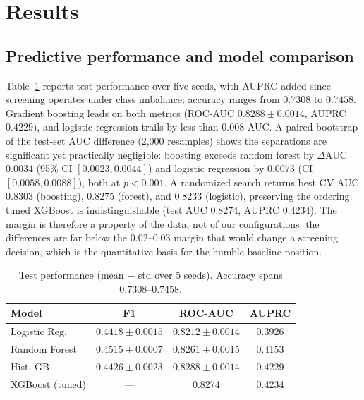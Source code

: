 \documentclass[conference]{IEEEtran}
\begin{document}
\section{Results}

\subsection{Predictive performance and model comparison}
Table~\ref{tab:perf} reports test performance over five seeds, with AUPRC added since screening operates under class imbalance; accuracy ranges from $0.7308$ to $0.7458$. Gradient boosting leads on both metrics (ROC-AUC $0.8288 \pm 0.0014$, AUPRC $0.4229$), and logistic regression trails by less than $0.008$ AUC. A paired bootstrap of the test-set AUC difference (2{,}000 resamples) shows the separations are significant yet practically negligible: boosting exceeds random forest by $\Delta$AUC $0.0034$ (95\% CI $[0.0023, 0.0044]$) and logistic regression by $0.0073$ (CI $[0.0058, 0.0088]$), both at $p<0.001$. A randomized search returns best CV AUC $0.8303$ (boosting), $0.8275$ (forest), and $0.8233$ (logistic), preserving the ordering; tuned XGBoost is indistinguishable (test AUC $0.8274$, AUPRC $0.4234$). The margin is therefore a property of the data, not of our configurations: the differences are far below the $0.02$--$0.03$ margin that would change a screening decision, which is the quantitative basis for the humble-baseline position.

\begin{table}[!t]
\caption{Test performance (mean $\pm$ std over 5 seeds). Accuracy spans $0.7308$--$0.7458$.}
\label{tab:perf}
\centering
\footnotesize
\begin{tabular}{lccc}
\toprule
Model & F1 & ROC-AUC & AUPRC \\
\midrule
Logistic Reg. & $0.4418 \pm 0.0015$ & $0.8212 \pm 0.0014$ & 0.3926 \\
Random Forest & $0.4515 \pm 0.0007$ & $0.8261 \pm 0.0015$ & 0.4153 \\
Hist. GB & $0.4426 \pm 0.0023$ & $0.8288 \pm 0.0014$ & 0.4229 \\
XGBoost (tuned) & --- & 0.8274 & 0.4234 \\
\bottomrule
\end{tabular}
\end{table}
\end{document}
